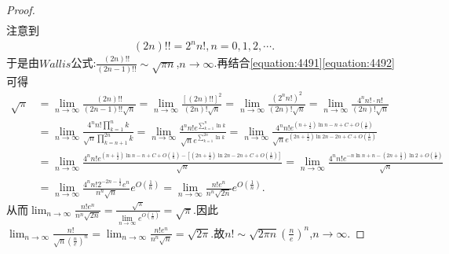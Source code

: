 \documentclass[../../main.tex]{subfiles}%
\begin{document}
\begin{proof}
\begin{align}
\end{align}
注意到
\begin{align}\label{equation:4492}
(2n)!! = 2^n n!, n = 0,1,2,\cdots.
\end{align}
于是由\(Wallis\)公式:\(\frac{(2n)!!}{(2n - 1)!!}\sim\sqrt{\pi n}\),\(n\rightarrow\infty\).再结合\eqref{equation:4491}\eqref{equation:4492}可得
\begin{align*}
\sqrt{\pi}&=\underset{n\rightarrow \infty}{\lim}\frac{\left( 2n \right) !!}{\left( 2n-1 \right) !!\sqrt{n}}=\underset{n\rightarrow \infty}{\lim}\frac{\left[ \left( 2n \right) !! \right] ^2}{\left( 2n \right) !\sqrt{n}}=\underset{n\rightarrow \infty}{\lim}\frac{\left( 2^nn! \right) ^2}{\left( 2n \right) !\sqrt{n}}=\underset{n\rightarrow \infty}{\lim}\frac{4^nn!\cdot n!}{\left( 2n \right) !\sqrt{n}}
\\
&=\underset{n\rightarrow \infty}{\lim}\frac{4^nn!\prod\limits_{k=1}^n{k}}{\sqrt{n}\prod\limits_{k=n+1}^{2n}{k}}=\underset{n\rightarrow \infty}{\lim}\frac{4^nn!e^{\sum\limits_{k=1}^n{\ln k}}}{\sqrt{n}e^{\sum\limits_{k=1}^{2n}{\ln k}}}=\underset{n\rightarrow \infty}{\lim}\frac{4^nn!e^{\left( n+\frac{1}{2} \right) \ln n-n+C+O\left( \frac{1}{n} \right)}}{\sqrt{n}e^{\left( 2n+\frac{1}{2} \right) \ln 2n-2n+C+O\left( \frac{1}{n} \right)}}
\\
&=\underset{n\rightarrow \infty}{\lim}\frac{4^nn!e^{\left( n+\frac{1}{2} \right) \ln n-n+C+O\left( \frac{1}{n} \right) -\left[ \left( 2n+\frac{1}{2} \right) \ln 2n-2n+C+O\left( \frac{1}{n} \right) \right]}}{\sqrt{n}}=\underset{n\rightarrow \infty}{\lim}\frac{4^nn!e^{-n\ln n+n-\left( 2n+\frac{1}{2} \right) \ln 2+O\left( \frac{1}{n} \right)}}{\sqrt{n}}
\\
&=\underset{n\rightarrow \infty}{\lim}\frac{4^nn!2^{-2n-\frac{1}{2}}e^n}{n^n\sqrt{n}}e^{O\left( \frac{1}{n} \right)}=\underset{n\rightarrow \infty}{\lim}\frac{n!e^n}{n^n\sqrt{2n}}e^{O\left( \frac{1}{n} \right)}.
\end{align*}
从而\(\lim_{n\rightarrow\infty}\frac{n!e^n}{n^n\sqrt{2n}}=\frac{\sqrt{\pi}}{\lim\limits_{n\rightarrow\infty}e^{O\left(\frac{1}{n}\right)}}=\sqrt{\pi}\).因此\(\lim_{n\rightarrow\infty}\frac{n!}{\sqrt{n}\left(\frac{n}{e}\right)^n}=\lim_{n\rightarrow\infty}\frac{n!e^n}{n^n\sqrt{n}}=\sqrt{2\pi}\).故\(n!\sim\sqrt{2\pi n}\left(\frac{n}{e}\right)^n\),\(n\rightarrow\infty\).
\end{proof}
\end{document}

